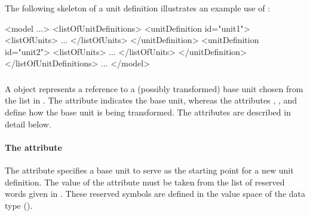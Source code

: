 The following skeleton of a unit definition illustrates an example
use of \UnitDefinition:

\begin{example}
<model ...>
    <listOfUnitDefinitions>
        <unitDefinition id="unit1">
            <listOfUnits>
                ...
            </listOfUnits>
        </unitDefinition>
        <unitDefinition id="unit2">
            <listOfUnits>
                ...
            </listOfUnits>
        </unitDefinition>
    </listOfUnitDefinitions>
    ...
</model>
\end{example}


\subsubsection{}
\label{sec:unit-structure}

A \Unit object represents a reference to a (possibly transformed)
base unit chosen from the list in .  The
attribute  indicates the base unit, whereas the
attributes , , and 
define how the base unit is being transformed.  The attributes
are described in detail below.


\paragraph{The  attribute}

The \Unit attribute  specifies a base unit to serve as
the starting point for a new unit definition.  The value of the
attribute must be taken from the list of reserved words given in
.  These reserved symbols are defined in
the value space of the data type 
().

